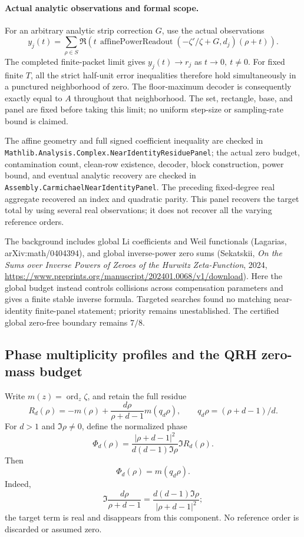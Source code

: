 \paragraph{Actual analytic observations and formal scope.}
For an arbitrary analytic strip correction \(G\), use the actual observations
\[
 y_j(t)=\sum_{\rho\in S}
 \Re\!\left(t\,\operatorname{affinePowerReadout}
       (-\zeta'/\zeta+G,d_j)(\rho+t)\right).
\]
The completed finite-packet limit gives \(y_j(t)\to r_j\) as
\(t\to0,\ t\ne0\). For fixed finite \(T\), all the strict half-unit
error inequalities therefore hold simultaneously in a punctured neighborhood
of zero. The floor-maximum decoder is consequently exactly equal to \(A\)
throughout that neighborhood. The set, rectangle, base, and panel are fixed
before taking this limit; no uniform step-size or sampling-rate bound is claimed.

The affine geometry and full signed coefficient inequality are checked in
\texttt{Mathlib.Analysis.Complex.NearIdentityResiduePanel}; the actual zero
budget, contamination count, clean-row existence, decoder, block construction,
power bound, and eventual analytic recovery are checked in
\texttt{Assembly.CarmichaelNearIdentityPanel}.
The preceding fixed-degree real aggregate recovered an index and quadratic
parity. This panel recovers the target total by using several real observations;
it does not recover all the varying reference orders.

The background includes global Li coefficients and Weil functionals
(Lagarias, arXiv:math/0404394), and global inverse-power zero sums
(Sekatskii, \textit{On the Sums over Inverse Powers of Zeroes of the Hurwitz
Zeta-Function}, 2024,
\url{https://www.preprints.org/manuscript/202401.0068/v1/download}).
Here the global budget instead controls collisions across compensation
parameters and gives a finite stable inverse formula. Targeted searches
found no matching near-identity finite-panel statement; priority remains
unestablished. The certified global zero-free boundary remains \(7/8\).

\subsection{Phase multiplicity profiles and the QRH zero-mass budget}
\label{sec:phase-multiplicity-mass}

Write \(m(z)=\operatorname{ord}_z\zeta\), and retain the full residue
\[
 R_d(\rho)=-m(\rho)+\frac{d\rho}{\rho+d-1}m(q_d\rho),
 \qquad q_d\rho=(\rho+d-1)/d.
\]
For \(d>1\) and \(\Im\rho\ne0\), define the normalized phase
\[
 \Phi_d(\rho)=
 \frac{|\rho+d-1|^2}{d(d-1)\Im\rho}\Im R_d(\rho).
\]
Then
\begin{equation}\label{eq:phase-reference-order}
 \Phi_d(\rho)=m(q_d\rho).
\end{equation}
Indeed,
\[
 \Im\frac{d\rho}{\rho+d-1}
   =\frac{d(d-1)\Im\rho}{|\rho+d-1|^2};
\]
the target term is real and disappears from this component.
No reference order is discarded or assumed zero.

